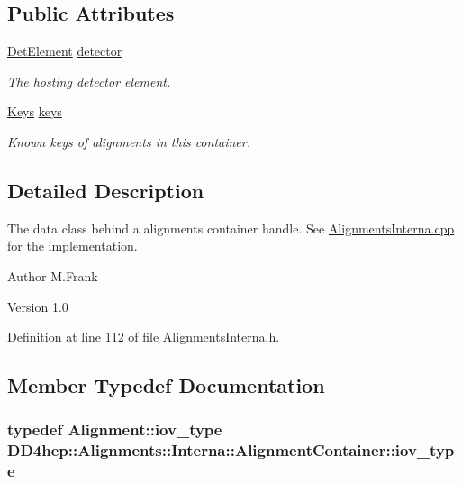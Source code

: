 \subsection*{Public Attributes}
\begin{DoxyCompactItemize}
\item 
\hyperlink{namespace_d_d4hep_a21dd977310ff183f61ca6ae14b59a989}{DetElement} \hyperlink{class_d_d4hep_1_1_alignments_1_1_interna_1_1_alignment_container_a21939f73d4dae58da536ec3f3480e7d3}{detector}
\begin{DoxyCompactList}\small\item\em The hosting detector element. \item\end{DoxyCompactList}\item 
\hyperlink{class_d_d4hep_1_1_alignments_1_1_interna_1_1_alignment_container_a3fc62784c22ba44d9ac63c424ec55799}{Keys} \hyperlink{class_d_d4hep_1_1_alignments_1_1_interna_1_1_alignment_container_adb4a3abb58c149338ecc2d08e2c0aec9}{keys}
\begin{DoxyCompactList}\small\item\em Known keys of alignments in this container. \item\end{DoxyCompactList}\end{DoxyCompactItemize}


\subsection{Detailed Description}
The data class behind a alignments container handle. See \hyperlink{_alignments_interna_8cpp}{AlignmentsInterna.cpp} for the implementation.

\begin{DoxyAuthor}{Author}
M.Frank 
\end{DoxyAuthor}
\begin{DoxyVersion}{Version}
1.0 
\end{DoxyVersion}


Definition at line 112 of file AlignmentsInterna.h.

\subsection{Member Typedef Documentation}
\hypertarget{class_d_d4hep_1_1_alignments_1_1_interna_1_1_alignment_container_a99b2a8d269ecefcf1b59269ad94e75e3}{
\subsubsection[{iov\_\-type}]{\setlength{\rightskip}{0pt plus 5cm}typedef {\bf Alignment::iov\_\-type} {\bf DD4hep::Alignments::Interna::AlignmentContainer::iov\_\-type}}}
\label{class_d_d4hep_1_1_alignments_1_1_interna_1_1_alignment_container_a99b2a8d269ecefcf1b59269ad94e75e3}


